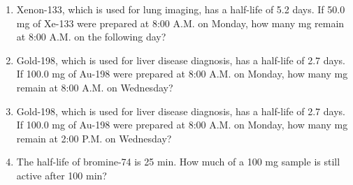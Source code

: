 \documentclass[main.tex]{subfiles}
\begin{document}
\begin{multicols*}{2}
\begin{enumerate}
\item  Xenon-133, which is used for lung imaging, has a half-life of 5.2 days.  If 50.0 mg of Xe-133 were prepared at 8:00 A.M. on Monday, how many mg remain at 8:00 A.M. on the following day?
\begin{enumerate}[label=(\alph*)]
\end{enumerate}
\item  Gold-198, which is used for liver disease diagnosis, has a half-life of 2.7 days.  If 100.0 mg of Au-198 were prepared at 8:00 A.M. on Monday, how many mg remain at 8:00 A.M. on Wednesday?
\begin{enumerate}[label=(\alph*)]
\end{enumerate}

\item  Gold-198, which is used for liver disease diagnosis, has a half-life of 2.7 days.  If 100.0 mg of Au-198 were prepared at 8:00 A.M. on Monday, how many mg remain at 2:00 P.M. on Wednesday?
\begin{enumerate}[label=(\alph*)]
\end{enumerate}

\item  The half-life of bromine-74 is 25 min. How much of a 100 mg sample is still active after 100 min?
\begin{enumerate}[label=(\alph*)]
\end{enumerate}




\end{enumerate}
\end{multicols*}
\end{document}
